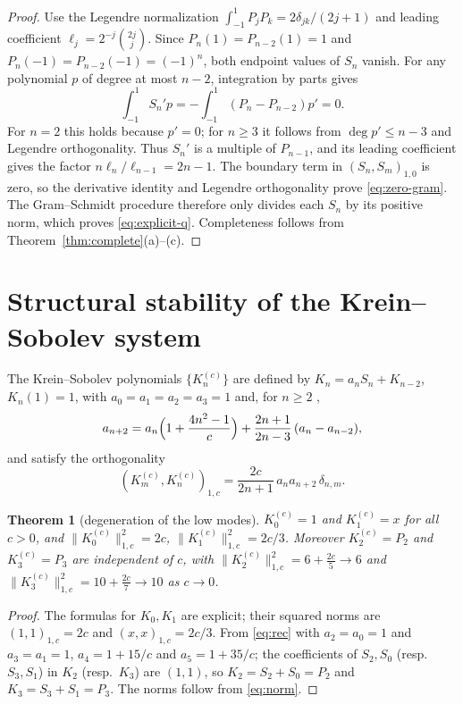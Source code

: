 ﻿\documentclass[11pt]{article}
\newtheorem{theorem}{Theorem}[section]
\begin{document}
\begin{proof}
	Use the Legendre normalization
	$\int_{-1}^1P_jP_k=2\delta_{jk}/(2j+1)$ and leading coefficient
	$\ell_j=2^{-j}\binom{2j}{j}$.  Since
	$P_n(1)=P_{n-2}(1)=1$ and
	$P_n(-1)=P_{n-2}(-1)=(-1)^n$, both endpoint values of $S_n$ vanish.
	For any polynomial $p$ of degree at most $n-2$, integration by parts
	gives
	\begin{equation*}
		\int_{-1}^1S_n'p=-\int_{-1}^1(P_n-P_{n-2})p'=0.
	\end{equation*}
	For $n=2$ this holds because $p'=0$; for $n\ge3$ it follows from
	$\deg p'\le n-3$ and Legendre orthogonality.  Thus $S_n'$ is a
	multiple of $P_{n-1}$, and its leading coefficient gives the factor
	$n\ell_n/\ell_{n-1}=2n-1$.  The boundary term in
	$(S_n,S_m)_{1,0}$ is zero, so the derivative identity and Legendre
	orthogonality prove \eqref{eq:zero-gram}.  The Gram--Schmidt procedure
	therefore only divides each $S_n$ by its positive norm, which proves
	\eqref{eq:explicit-q}.  Completeness follows from
	Theorem~\ref{thm:complete}(a)--(c).
\end{proof}

\section{Structural stability of the Krein--Sobolev system}

The Krein--Sobolev polynomials $\{K_n^{(c)}\}$ are defined by
$K_n=a_nS_n+K_{n-2}$, $K_n(1)=1$, with $a_0=a_1=a_2=a_3=1$ and, for $n\ge 2$
\cite[eq.~(19)]{axioms},
\begin{equation}
	a_{n+2}=a_n\Bigl(1+\frac{4n^2-1}{c}\Bigr)
	+\frac{2n+1}{2n-3}\,(a_n-a_{n-2}),
	\label{eq:rec}
\end{equation}
and satisfy the orthogonality \cite[Theorem 3]{axioms}
\begin{equation}
	(K_m^{(c)},K_n^{(c)})_{1,c}=\frac{2c}{2n+1}\,a_n a_{n+2}\,\delta_{n,m}.
	\label{eq:norm}
\end{equation}

\begin{theorem}[degeneration of the low modes]\label{thm:low}
	$K_0^{(c)}=1$ and $K_1^{(c)}=x$ for all $c>0$, and
	$\|K_0^{(c)}\|_{1,c}^2=2c$, $\|K_1^{(c)}\|_{1,c}^2=2c/3$.
	Moreover $K_2^{(c)}=P_2$ and $K_3^{(c)}=P_3$ are independent of $c$, with
	$\|K_2^{(c)}\|_{1,c}^2=6+\frac{2c}5\to 6$ and
	$\|K_3^{(c)}\|_{1,c}^2=10+\frac{2c}7\to 10$ as $c\to 0$.
\end{theorem}

\begin{proof}
	The formulas for $K_0,K_1$ are explicit; their squared norms are
	$(1,1)_{1,c}=2c$ and $(x,x)_{1,c}=2c/3$.  From \eqref{eq:rec} with
	$a_2=a_0=1$ and $a_3=a_1=1$,
	$a_4=1+15/c$ and $a_5=1+35/c$; the coefficients of $S_2,S_0$ (resp.\
	$S_3,S_1$) in $K_2$ (resp.\ $K_3$) are $(1,1)$, so
	$K_2=S_2+S_0=P_2$ and $K_3=S_3+S_1=P_3$.  The norms follow from
	\eqref{eq:norm}.
\end{proof}
\end{document}
